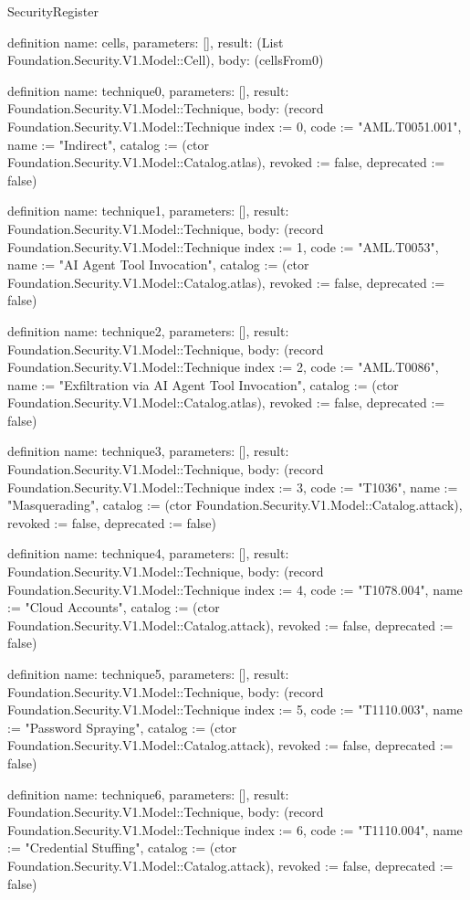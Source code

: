 \begin{lexlean}{SecurityRegister}
\begin{semanticmodule}
definition{
  name: cells,
  parameters: [],
  result: (List Foundation.Security.V1.Model::Cell),
  body: (cellsFrom0)
}

definition{
  name: technique0,
  parameters: [],
  result: Foundation.Security.V1.Model::Technique,
  body: (record Foundation.Security.V1.Model::Technique {index := 0, code := "AML.T0051.001", name := "Indirect", catalog := (ctor Foundation.Security.V1.Model::Catalog.atlas), revoked := false, deprecated := false})
}

definition{
  name: technique1,
  parameters: [],
  result: Foundation.Security.V1.Model::Technique,
  body: (record Foundation.Security.V1.Model::Technique {index := 1, code := "AML.T0053", name := "AI Agent Tool Invocation", catalog := (ctor Foundation.Security.V1.Model::Catalog.atlas), revoked := false, deprecated := false})
}

definition{
  name: technique2,
  parameters: [],
  result: Foundation.Security.V1.Model::Technique,
  body: (record Foundation.Security.V1.Model::Technique {index := 2, code := "AML.T0086", name := "Exfiltration via AI Agent Tool Invocation", catalog := (ctor Foundation.Security.V1.Model::Catalog.atlas), revoked := false, deprecated := false})
}

definition{
  name: technique3,
  parameters: [],
  result: Foundation.Security.V1.Model::Technique,
  body: (record Foundation.Security.V1.Model::Technique {index := 3, code := "T1036", name := "Masquerading", catalog := (ctor Foundation.Security.V1.Model::Catalog.attack), revoked := false, deprecated := false})
}

definition{
  name: technique4,
  parameters: [],
  result: Foundation.Security.V1.Model::Technique,
  body: (record Foundation.Security.V1.Model::Technique {index := 4, code := "T1078.004", name := "Cloud Accounts", catalog := (ctor Foundation.Security.V1.Model::Catalog.attack), revoked := false, deprecated := false})
}

definition{
  name: technique5,
  parameters: [],
  result: Foundation.Security.V1.Model::Technique,
  body: (record Foundation.Security.V1.Model::Technique {index := 5, code := "T1110.003", name := "Password Spraying", catalog := (ctor Foundation.Security.V1.Model::Catalog.attack), revoked := false, deprecated := false})
}

definition{
  name: technique6,
  parameters: [],
  result: Foundation.Security.V1.Model::Technique,
  body: (record Foundation.Security.V1.Model::Technique {index := 6, code := "T1110.004", name := "Credential Stuffing", catalog := (ctor Foundation.Security.V1.Model::Catalog.attack), revoked := false, deprecated := false})
}


\end{semanticmodule}
\end{lexlean}
